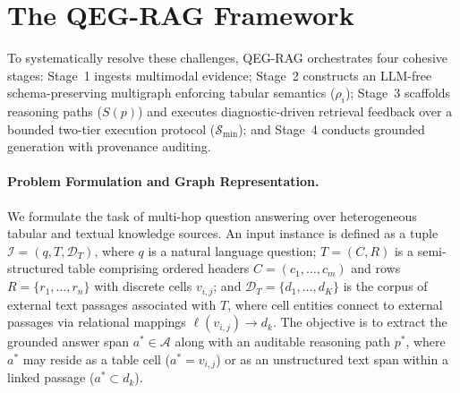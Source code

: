 \documentclass[runningheads]{llncs}
\begin{document}
\section{The QEG-RAG Framework}
\label{sec:method}



To systematically resolve these challenges, QEG-RAG orchestrates four cohesive stages: Stage~1 ingests multimodal evidence; Stage~2 constructs an LLM-free schema-preserving multigraph enforcing tabular semantics ($\rho_i$); Stage~3 scaffolds reasoning paths ($S(p)$) and executes diagnostic-driven retrieval feedback over a bounded two-tier execution protocol ($\mathcal{S}_{\min}$); and Stage~4 conducts grounded generation with provenance auditing.

\paragraph{Problem Formulation and Graph Representation.}
\label{sec:formulation}
We formulate the task of multi-hop question answering over heterogeneous tabular and textual knowledge sources. An input instance is defined as a tuple $\mathcal{I} = (q, T, \mathcal{D}_T)$, where $q$ is a natural language question; $T = (C, R)$ is a semi-structured table comprising ordered headers $C = (c_1, \dots, c_m)$ and rows $R = \{r_1, \dots, r_n\}$ with discrete cells $v_{i,j}$; and $\mathcal{D}_T = \{d_1, \dots, d_K\}$ is the corpus of external text passages associated with $T$, where cell entities connect to external passages via relational mappings $\ell(v_{i,j}) \rightarrow d_k$. The objective is to extract the grounded answer span $a^* \in \mathcal{A}$ along with an auditable reasoning path $p^*$, where $a^*$ may reside as a table cell ($a^* = v_{i,j}$) or as an unstructured text span within a linked passage ($a^* \subset d_k$).
\end{document}
